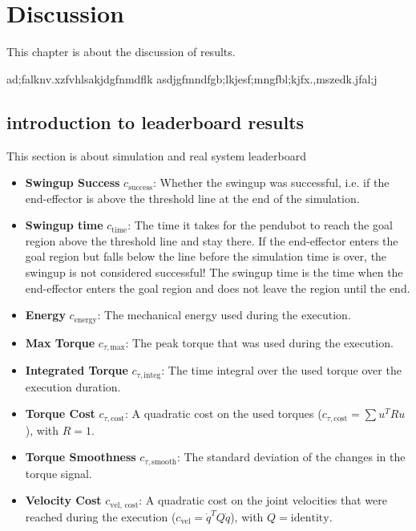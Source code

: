 \chapter{Discussion}
This chapter is about the discussion of results.

ad;falknv.xzfvhlsakjdgfnmdflk asdjgfmndfgb;lkjesf;mngfbl;kjfx.,mszedk.jfal;j

\section{introduction to leaderboard results}
This section is about simulation and real system leaderboard

\begin{itemize}
  \item \textbf{Swingup Success} \(c_{\text{success}}\):
  Whether the swingup was successful, i.e. if the end-effector is above the threshold line at the end of the simulation.
  
  \item \textbf{Swingup time} \(c_{\text{time}}\):
  The time it takes for the pendubot to reach the goal region above the threshold line and stay there. If the end-effector enters the goal region but falls below the line before the simulation time is over, the swingup is not considered successful! The swingup time is the time when the end-effector enters the goal region and does not leave the region until the end.
  
  \item \textbf{Energy} \(c_{\text{energy}}\):
  The mechanical energy used during the execution.
  
  \item \textbf{Max Torque} \(c_{\tau, \text{max}}\):
  The peak torque that was used during the execution.
  
  \item \textbf{Integrated Torque} \(c_{\tau, \text{integ}}\):
  The time integral over the used torque over the execution duration.
  
  \item \textbf{Torque Cost} \(c_{\tau, \text{cost}}\):
  A quadratic cost on the used torques (\(c_{\tau, \text{cost}} = \sum u^TRu\)), with \(R = 1\).
  
  \item \textbf{Torque Smoothness} \(c_{\tau, \text{smooth}}\):
  The standard deviation of the changes in the torque signal.
  
  \item \textbf{Velocity Cost} \(c_{\text{vel, cost}}\):
  A quadratic cost on the joint velocities that were reached during the execution (\(c_{\text{vel}} = \dot{q}^T Q \dot{q}\)), with \(Q = \text{identity}\).
\end{itemize}



